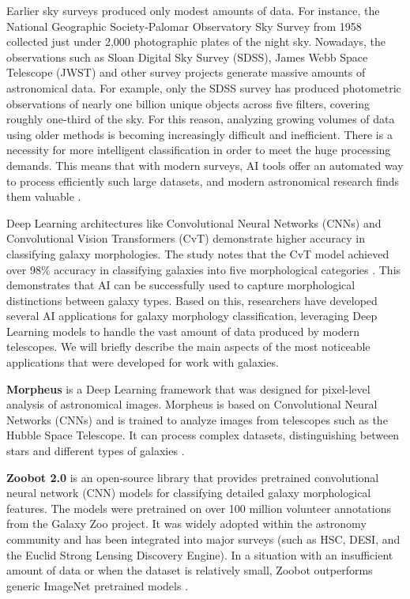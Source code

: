 Earlier sky surveys produced only modest amounts of data. For instance, the National Geographic Society-Palomar Observatory Sky Survey from 1958 collected just under 2,000 photographic plates of the night sky. Nowadays, the observations such as Sloan Digital Sky Survey (SDSS), James Webb Space Telescope (JWST) and other survey projects generate massive amounts of astronomical data. For example, only the SDSS survey has produced photometric observations of nearly one billion unique objects across five filters, covering roughly one-third of the sky. For this reason, analyzing growing volumes of data using older methods is becoming increasingly difficult and inefficient. There is a necessity for more intelligent classification in order to meet the huge processing demands. This means that with modern surveys, AI tools offer an automated way to process efficiently such large datasets, and modern astronomical research finds them valuable \cite{Li_2023}.

Deep Learning architectures like Convolutional Neural Networks (CNNs) and Convolutional Vision Transformers (CvT) demonstrate higher accuracy in classifying galaxy morphologies. The study notes that the CvT model achieved over 98\% accuracy in classifying galaxies into five morphological categories \cite{cao2024galaxy}. This demonstrates that AI can be successfully used to capture morphological distinctions between galaxy types. Based on this, researchers have developed several AI applications for galaxy morphology classification, leveraging Deep Learning models to handle the vast amount of data produced by modern telescopes. We will briefly describe the main aspects of the most noticeable applications that were developed for work with galaxies.

\medskip

\textbf{Morpheus} is a Deep Learning framework that was designed for pixel-level analysis of astronomical images. Morpheus is based on Convolutional Neural Networks (CNNs) and is trained to analyze images from telescopes such as the Hubble Space Telescope. It can process complex datasets, distinguishing between stars and different types of galaxies \cite{Hausen_2020}.

\medskip

\textbf{Zoobot 2.0} is an open-source library that provides pretrained convolutional neural network (CNN) models for classifying detailed galaxy morphological features. The models were pretrained on over 100 million volunteer annotations from the Galaxy Zoo project. It was widely adopted within the astronomy community and has been integrated into major surveys (such as HSC, DESI, and the Euclid Strong Lensing Discovery Engine). In a situation with an insufficient amount of data or when the dataset is relatively small, Zoobot outperforms generic ImageNet pretrained models \cite{walmsley2024scalinglawsgalaxyimages}.

